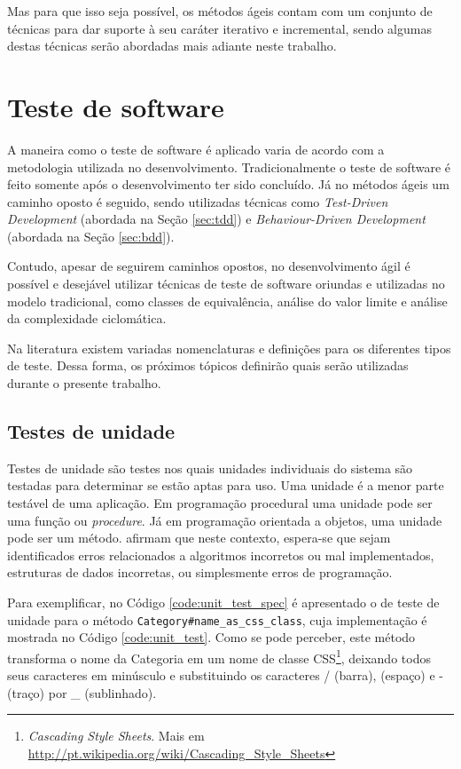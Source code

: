 Mas para que isso seja possível, os métodos ágeis contam com um conjunto de técnicas para dar suporte à seu caráter iterativo e incremental, sendo algumas destas técnicas serão abordadas mais adiante neste trabalho.



\section{Teste de software}
\label{sec:teste_de_software}


A maneira como o teste de software é aplicado varia de acordo com a metodologia utilizada no desenvolvimento. Tradicionalmente o teste de software é feito somente após o desenvolvimento ter sido concluído. Já no métodos ágeis um caminho oposto é seguido, sendo utilizadas técnicas como \textit{Test-Driven Development} (abordada na Seção \ref{sec:tdd}) e  \textit{Behaviour-Driven Development} (abordada na Seção \ref{sec:bdd}).

Contudo, apesar de seguirem caminhos opostos, no desenvolvimento ágil é possível e desejável utilizar técnicas de teste de software oriundas e utilizadas no modelo tradicional, como classes de equivalência, análise do valor limite e análise da complexidade ciclomática.

Na literatura existem variadas nomenclaturas e definições para os diferentes tipos de teste. Dessa forma, os próximos tópicos definirão quais serão utilizadas durante o presente trabalho.

\subsection{Testes de unidade}
\label{sub:testes_de_unidade}

Testes de unidade são testes nos quais unidades individuais do sistema são testadas para determinar se estão aptas para uso. Uma unidade é a menor parte testável de uma aplicação. Em programação procedural uma unidade pode ser uma função ou \textit{procedure}. Já em programação orientada a objetos, uma unidade pode ser um método.  afirmam que neste contexto, espera-se que sejam identificados erros relacionados a algoritmos incorretos ou mal implementados, estruturas de dados incorretas, ou simplesmente erros de programação.

Para exemplificar, no Código \ref{code:unit_test_spec} é apresentado o de teste de unidade para o método \texttt{Category\#name\_as\_css\_class}, cuja implementação é mostrada no Código \ref{code:unit_test}. Como se pode perceber, este método transforma o nome da Categoria em um nome de classe CSS\footnote{\textit{Cascading Style Sheets}. Mais em \url{http://pt.wikipedia.org/wiki/Cascading_Style_Sheets}}, deixando todos seus caracteres em minúsculo e substituindo os caracteres / (barra),  (espaço) e - (traço) por \_ (sublinhado).


